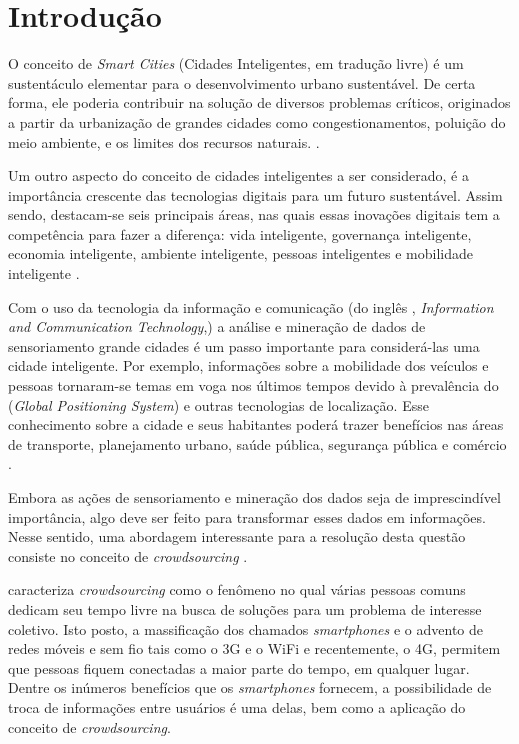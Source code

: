 \chapter{Introdução}\label{cap:introducao}

O conceito de \textit{Smart Cities} (Cidades Inteligentes, em tradução livre) é um sustentáculo elementar para o desenvolvimento urbano sustentável. De certa forma, ele poderia contribuir na solução de diversos problemas críticos, originados a partir da urbanização de grandes cidades como congestionamentos, poluição do meio ambiente, e os limites dos recursos naturais. \cite{pan2013}.
 
Um outro aspecto do conceito de cidades inteligentes a ser considerado, é a importância crescente das tecnologias digitais para um futuro sustentável. Assim sendo, destacam-se seis principais áreas, nas quais essas inovações digitais tem a competência para fazer a diferença: vida inteligente, governança inteligente, economia inteligente, ambiente inteligente, pessoas inteligentes e mobilidade inteligente \cite{schuurman}.
 
Com o uso da tecnologia da informação e comunicação (do inglês {, \emph{Information and Communication Technology},}) a  análise e mineração de dados de sensoriamento grande cidades é um passo importante para considerá-las uma cidade inteligente. Por exemplo, informações sobre a mobilidade dos veículos e pessoas tornaram-se temas em voga nos últimos tempos  devido à prevalência do  (\emph{Global Positioning System}) e outras tecnologias de localização. Esse conhecimento sobre a cidade e seus habitantes poderá trazer benefícios nas áreas de transporte, planejamento urbano, saúde pública, segurança pública e comércio \cite{pan2013}.
 
Embora as ações de sensoriamento e mineração dos dados seja de imprescindível importância, algo deve ser feito para transformar esses dados em informações. Nesse sentido, uma abordagem interessante para a resolução desta questão consiste no conceito de \textit{crowdsourcing} \cite{schuurman}.

 caracteriza \textit{crowdsourcing} como o fenômeno no qual várias pessoas comuns dedicam seu tempo livre na busca de soluções para um problema de interesse coletivo. Isto posto, a massificação dos chamados \textit{smartphones} e o advento de redes móveis e sem fio tais como o 3G e o WiFi e recentemente, o 4G, permitem que pessoas fiquem conectadas a maior parte do tempo, em qualquer lugar. Dentre os inúmeros benefícios que os \textit{smartphones} fornecem, a possibilidade de troca de informações entre usuários é uma delas, bem como a aplicação do conceito de \textit{crowdsourcing}.

